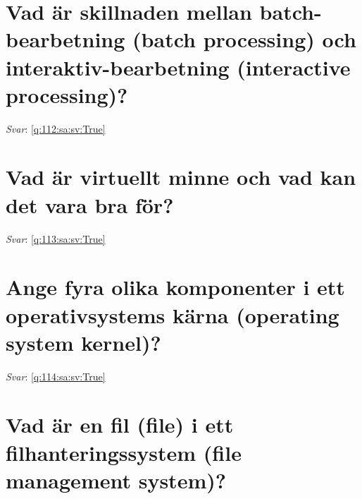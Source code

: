 \documentclass[a4paper,11pt,oneside]{book}
\begin{document}
\begin{sloppypar}
\section{Vad \"ar skillnaden mellan batch-bearbetning (batch processing) och interaktiv-bearbetning (interactive processing)?}

\label{q:112:sa:sv:False}

\vspace{2cm}

\noindent\makebox[\textwidth]{\hrulefill}

\vspace{1cm}

\textit{Svar}: \autoref{q:112:sa:sv:True}



\section{Vad \"ar virtuellt minne och vad kan det vara bra f\"or?}

\label{q:113:sa:sv:False}

\vspace{2cm}

\noindent\makebox[\textwidth]{\hrulefill}

\vspace{1cm}

\textit{Svar}: \autoref{q:113:sa:sv:True}



\section{Ange fyra olika komponenter i ett operativsystems k\"arna (operating system kernel)?}

\label{q:114:sa:sv:False}

\vspace{2cm}

\noindent\makebox[\textwidth]{\hrulefill}

\vspace{1cm}

\textit{Svar}: \autoref{q:114:sa:sv:True}



\section{Vad \"ar en fil (file) i ett filhanteringssystem (file management system)?}

\label{q:115:sa:sv:False}


\end{sloppypar}
\end{document}
